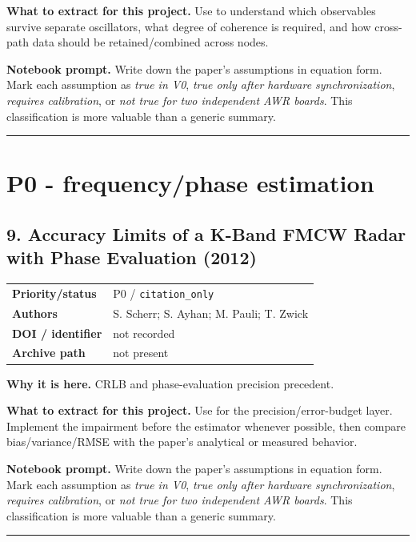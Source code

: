 \documentclass[10.5pt]{article}
\begin{document}
\textbf{What to extract for this project.} Use to understand which observables survive separate oscillators, what degree of coherence is required, and how cross-path data should be retained/combined across nodes.

\textbf{Notebook prompt.} Write down the paper's assumptions in equation form. Mark each assumption as \emph{true in V0}, \emph{true only after hardware synchronization}, \emph{requires calibration}, or \emph{not true for two independent AWR boards}. This classification is more valuable than a generic summary.

\vspace{0.35em}\hrule\vspace{0.65em}

\clearpage
\section{P0 - frequency/phase estimation}

\subsection*{9. Accuracy Limits of a K-Band FMCW Radar with Phase Evaluation (2012)}
\begin{tabularx}{\textwidth}{@{}p{}X@{}}
\textbf{Priority/status} & P0 / \nolinkurl{citation_only} \\
\textbf{Authors} & S. Scherr; S. Ayhan; M. Pauli; T. Zwick \\
\textbf{DOI / identifier} & not recorded \\
\textbf{Archive path} & not present \\
\end{tabularx}
\textbf{Why it is here.} CRLB and phase-evaluation precision precedent.

\textbf{What to extract for this project.} Use for the precision/error-budget layer. Implement the impairment before the estimator whenever possible, then compare bias/variance/RMSE with the paper's analytical or measured behavior.

\textbf{Notebook prompt.} Write down the paper's assumptions in equation form. Mark each assumption as \emph{true in V0}, \emph{true only after hardware synchronization}, \emph{requires calibration}, or \emph{not true for two independent AWR boards}. This classification is more valuable than a generic summary.

\vspace{0.35em}\hrule\vspace{0.65em}
\end{document}
